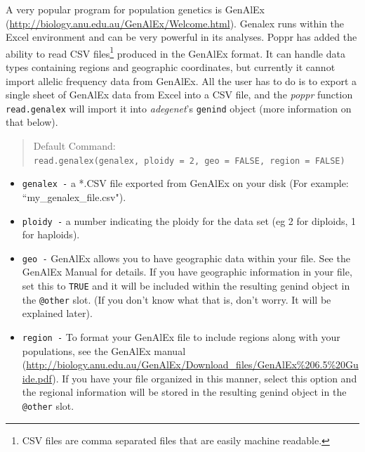 \documentclass[letterpaper]{article}
\newcommand{\tab}{\hspace*{1em}}
\begin{document}
\tab\tab A very popular program for population genetics is GenAlEx (\url{http://biology.anu.edu.au/GenAlEx/Welcome.html}). \cite{Peakall:2012} Genalex runs within the Excel environment and can be very powerful in its analyses. Poppr has added the ability to read CSV files\footnote{CSV files are comma separated files that are easily machine readable.} produced in the GenAlEx format. It can handle data types containing regions and geographic coordinates, but currently it cannot import allelic frequency data from GenAlEx. All the user has to do is to export a single sheet of GenAlEx data from Excel into a CSV file, and the \textit{poppr} function \texttt{read.genalex} will import it into \textit{adegenet}'s \texttt{genind} object (more information on that below).
\begin{quote}
Default Command:\\
\texttt{read.genalex(genalex, ploidy = 2, geo = FALSE, region = FALSE)}
\end{quote}
\begin{itemize}
  \item \texttt{genalex -} a *.CSV file exported from GenAlEx on your disk (For example: ``my\_genalex\_file.csv").
  \item \texttt{ploidy -} a number indicating the ploidy for the data set (eg 2 for diploids, 1 for haploids).
  \item \texttt{geo -} GenAlEx allows you to have geographic data within your file. See the GenAlEx Manual for details. If you have geographic information in your file,
  set this to \texttt{TRUE} and it will be included within the resulting genind object in the \texttt{@other} slot. (If you don't know what that is, don't worry. It will be explained later).
  \item \texttt{region -} To format your GenAlEx file to include regions along with your populations, see the GenAlEx manual (\url{http://biology.anu.edu.au/GenAlEx/Download_files/GenAlEx\%206.5\%20Guide.pdf}). If you have your file organized in this manner, select this option and the regional information will be stored in the resulting genind object in the \texttt{@other} slot.
\end{itemize}
\begin{center}
\end{center}
\end{document}
